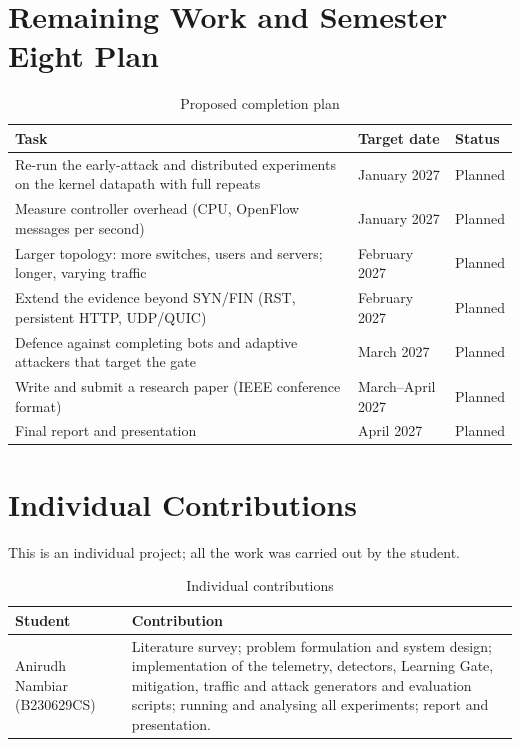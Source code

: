 \documentclass[12pt,a4paper,oneside]{report}
\begin{document}
\section{Remaining Work and Semester Eight Plan}
\begin{table}[htbp]\centering\caption{Proposed completion plan}\begin{tabularx}{\textwidth}{Xll}\toprule Task & Target date & Status\\\midrule
Re-run the early-attack and distributed experiments on the kernel datapath with full repeats & January 2027 & Planned\\
Measure controller overhead (CPU, OpenFlow messages per second) & January 2027 & Planned\\
Larger topology: more switches, users and servers; longer, varying traffic & February 2027 & Planned\\
Extend the evidence beyond SYN/FIN (RST, persistent HTTP, UDP/QUIC) & February 2027 & Planned\\
Defence against completing bots and adaptive attackers that target the gate & March 2027 & Planned\\
Write and submit a research paper (IEEE conference format) & March--April 2027 & Planned\\
Final report and presentation & April 2027 & Planned\\
\bottomrule\end{tabularx}\end{table}

\section{Individual Contributions}
This is an individual project; all the work was carried out by the student.
\begin{table}[htbp]\centering\caption{Individual contributions}\begin{tabularx}{\textwidth}{lX}\toprule Student & Contribution\\\midrule Anirudh Nambiar (B230629CS) & Literature survey; problem formulation and system design; implementation of the telemetry, detectors, Learning Gate, mitigation, traffic and attack generators and evaluation scripts; running and analysing all experiments; report and presentation.\\\bottomrule\end{tabularx}\end{table}
\clearpage
{}


\appendix
\end{document}
